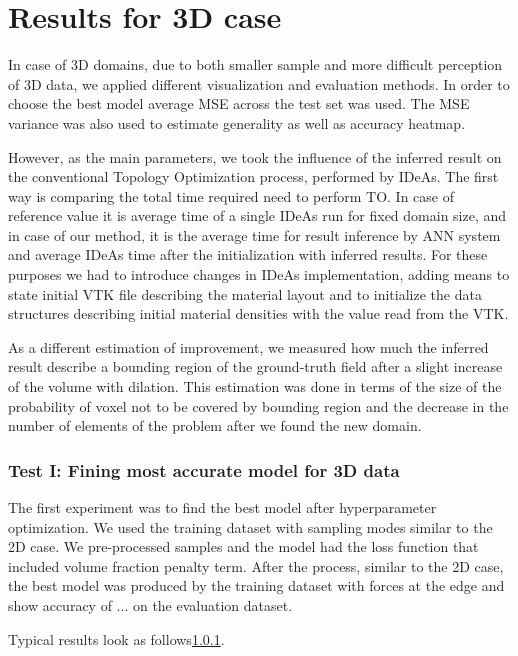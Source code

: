 \section{Results for 3D case}

In case of 3D domains, due to both smaller sample and more difficult perception of 3D data, we applied different visualization and evaluation methods.
In order to choose the best model average MSE across the test set was used.
The MSE variance was also used to estimate generality as well as accuracy heatmap.

However, as the main parameters, we took the influence of the inferred result on the conventional Topology Optimization process, performed by IDeAs.
The first way is comparing the total time required need to perform TO. 
In case of reference value it is average time of a single IDeAs run for fixed domain size, and in case of our method, it is the average time for result inference by ANN system and average IDeAs time after the initialization with inferred results. For these purposes we had to introduce changes in IDeAs implementation, adding means to state initial VTK file describing the material layout and to initialize the data structures describing initial material densities with the value read from the VTK.

As a different estimation of improvement, we measured how much the inferred result describe a bounding region of the ground-truth field after a slight increase of the volume with dilation.
This estimation was done in terms of the size of the probability of voxel not to be covered by bounding region and the decrease in the number of elements of the problem after we found the new domain. 

\subsubsection{Test I: Fining most accurate model for 3D data}

The first experiment was to find the best model after hyperparameter optimization.
We used the training dataset with sampling modes similar to the 2D case.
We pre-processed samples and the model had the loss function that included volume fraction penalty term.
After the process, similar to the 2D case, the best model was produced by the training dataset with forces at the edge and show accuracy of ... on the evaluation dataset. 

Typical results look as follows\ref{}.

